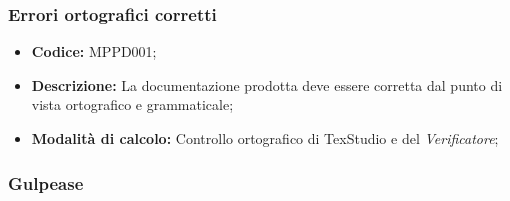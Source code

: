 \documentclass[../NormediProgetto.tex]{subfiles}
\begin{document}
\subsubsection{Errori ortografici corretti}

\begin{itemize}
	\item \textbf{Codice:} MPPD001;
	\item \textbf{Descrizione:} La documentazione prodotta deve essere corretta dal punto di vista ortografico e grammaticale;
	\item \textbf{Modalità di calcolo:} Controllo ortografico di TexStudio e del \textit{Verificatore};
\end{itemize}

\subsubsection{Gulpease}
\end{document}
